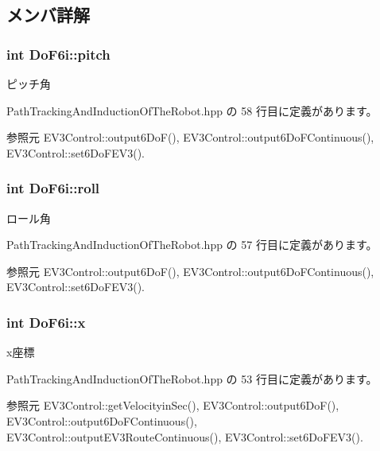 \subsection{メンバ詳解}
\subsubsection[{pitch}]{\setlength{\rightskip}{0pt plus 5cm}int Do\-F6i\-::pitch}\label{struct_do_f6i_a94d24304247e6b983487738ad8028ca6}


ピッチ角 



 Path\-Tracking\-And\-Induction\-Of\-The\-Robot.\-hpp の 58 行目に定義があります。



参照元 E\-V3\-Control\-::output6\-Do\-F(), E\-V3\-Control\-::output6\-Do\-F\-Continuous(), E\-V3\-Control\-::set6\-Do\-F\-E\-V3().

\subsubsection[{roll}]{\setlength{\rightskip}{0pt plus 5cm}int Do\-F6i\-::roll}\label{struct_do_f6i_a70be3e2561fe3bfbdda65ccd74495493}


ロール角 



 Path\-Tracking\-And\-Induction\-Of\-The\-Robot.\-hpp の 57 行目に定義があります。



参照元 E\-V3\-Control\-::output6\-Do\-F(), E\-V3\-Control\-::output6\-Do\-F\-Continuous(), E\-V3\-Control\-::set6\-Do\-F\-E\-V3().

\subsubsection[{x}]{\setlength{\rightskip}{0pt plus 5cm}int Do\-F6i\-::x}\label{struct_do_f6i_a5ff002261a386ad8927d1072ce4295ca}


x座標 



 Path\-Tracking\-And\-Induction\-Of\-The\-Robot.\-hpp の 53 行目に定義があります。



参照元 E\-V3\-Control\-::get\-Velocityin\-Sec(), E\-V3\-Control\-::output6\-Do\-F(), E\-V3\-Control\-::output6\-Do\-F\-Continuous(), E\-V3\-Control\-::output\-E\-V3\-Route\-Continuous(), E\-V3\-Control\-::set6\-Do\-F\-E\-V3().

